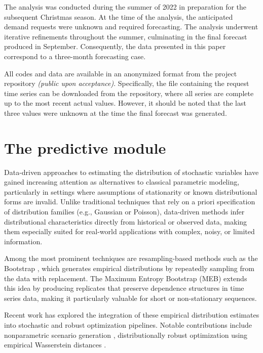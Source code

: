 \documentclass[ijoc,sglanonrev]{informs4}
\begin{document}
The analysis was conducted during the summer of 2022 in preparation for the subsequent Christmas season. At the time of the analysis, the anticipated demand requests were unknown and required forecasting. The analysis underwent iterative refinements throughout the summer, culminating in the final forecast produced in September. Consequently, the data presented in this paper correspond to a three-month forecasting case. 

All codes and data are available in an anonymized format from the project repository 
{\it (public upon acceptance)}. Specifically, the file containing the request time series can be downloaded from the repository, where all series are complete up to the most recent actual values. However, it should be noted that the last three values were unknown at the time the final forecast was generated. 

\section{The predictive module} \label{Sec:forecasting}

Data-driven approaches to estimating the distribution of stochastic variables have gained increasing attention as alternatives to classical parametric modeling, particularly in settings where assumptions of stationarity or known distributional forms are invalid. Unlike traditional techniques that rely on a priori specification of distribution families (e.g., Gaussian or Poisson), data-driven methods infer distributional characteristics directly from historical or observed data, making them especially suited for real-world applications with complex, noisy, or limited information.

Among the most prominent techniques are resampling-based methods such as the Bootstrap \citep{b1}, which generates empirical distributions by repeatedly sampling from the data with replacement. The Maximum Entropy Bootstrap (MEB) \citep{Vinod2006} extends this idea by producing replicates that preserve dependence structures in time series data, making it particularly valuable for short or non-stationary sequences.

Recent work has explored the integration of these empirical distribution estimates into stochastic and robust optimization pipelines. Notable contributions include nonparametric scenario generation \citep{BM11}, distributionally robust optimization using empirical Wasserstein distances \citep{EK17}. 
\end{document}

